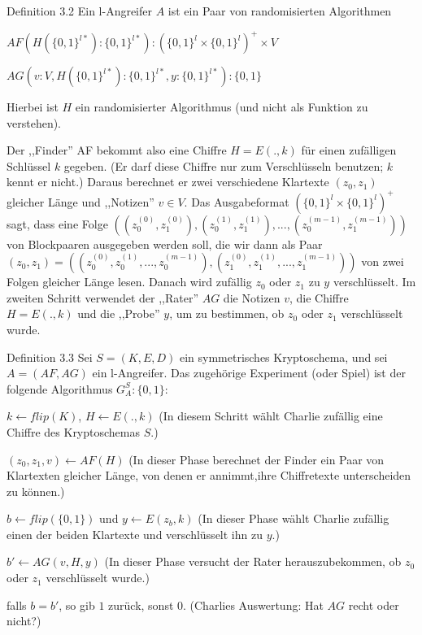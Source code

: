 \documentclass[a4paper]{article}
\begin{document}
\begin{multicols}{3}
    Definition 3.2 Ein l-Angreifer $A$ ist ein Paar von randomisierten Algorithmen
    \begin{itemize*}
        \item $AF(H(\{0,1\}^{l*}) :\{0,1\}^{l*}) : (\{0,1\}^l\times\{0,1\}^l)^+\times V$
        \item $AG(v:V,H(\{0,1\}^{l*}) :\{0,1\}^{l*},y:\{0,1\}^{l*}) :\{0,1\}$
    \end{itemize*}

    Hierbei ist $H$ ein randomisierter Algorithmus (und nicht als Funktion zu verstehen).

    Der ,,Finder'' AF bekommt also eine Chiffre $H=E(.,k)$ für einen zufälligen Schlüssel $k$ gegeben. (Er darf diese Chiffre nur zum Verschlüsseln benutzen; $k$ kennt er nicht.) Daraus berechnet er zwei verschiedene Klartexte $(z_0,z_1)$ gleicher Länge und ,,Notizen'' $v\in V$. Das Ausgabeformat $(\{0,1\}^l\times\{0,1\}^l)^+$ sagt, dass eine Folge $((z_0^{(0)},z^{(0)}_1),(z_0^{(1)},z_1^{(1)}),...,(z_0^{(m-1)},z_1^{(m-1)}))$ von Blockpaaren ausgegeben werden soll, die wir dann als Paar $(z_0 ,z_1) = ((z^{(0)}_0 ,z_0^{(1)},...,z_0^{(m-1)}),(z_1^{(0)},z^{(1)}_1 ,...,z_1^{(m-1)}))$ von zwei Folgen gleicher Länge lesen. Danach wird zufällig $z_0$ oder $z_1$ zu $y$ verschlüsselt.
    Im zweiten Schritt verwendet der ,,Rater'' $AG$ die Notizen $v$, die Chiffre $H=E(.,k)$ und die ,,Probe'' $y$, um zu bestimmen, ob $z_0$ oder $z_1$ verschlüsselt wurde.

    Definition 3.3 Sei $S=(K,E,D)$ ein symmetrisches Kryptoschema, und sei $A=(AF,AG)$ ein l-Angreifer. Das zugehörige Experiment (oder Spiel) ist der folgende Algorithmus $G^S_A:\{0,1\}:$
    \begin{enumerate*}
        \item $k\leftarrow flip(K)$, $H\leftarrow E(.,k)$ (In diesem Schritt wählt Charlie zufällig eine Chiffre des Kryptoschemas $S$.)
        \item $(z_0, z_1 ,v)\leftarrow AF(H)$ (In dieser Phase berechnet der Finder ein Paar von Klartexten gleicher Länge, von denen er annimmt,ihre Chiffretexte unterscheiden zu können.)
        \item $b\leftarrow flip(\{0,1\})$ und $y\leftarrow E(z_b,k)$ (In dieser Phase wählt Charlie zufällig einen der beiden Klartexte und verschlüsselt ihn zu $y$.)
        \item $b'\leftarrow AG(v,H,y)$ (In dieser Phase versucht der Rater herauszubekommen, ob $z_0$ oder $z_1$ verschlüsselt wurde.)
        \item falls $b=b'$, so gib $1$ zurück, sonst $0$. (Charlies Auswertung: Hat $AG$ recht oder nicht?)
    \end{enumerate*}


\end{multicols}
\end{document}
